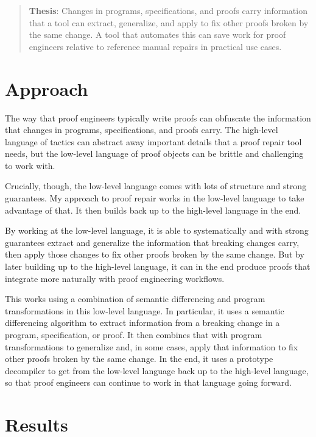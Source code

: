 \begin{quote}
\textbf{Thesis}: Changes in programs, specifications, and proofs carry information that a tool can extract, generalize, and apply to fix other proofs broken by the same change. A tool that automates this can save work for proof engineers relative to reference manual repairs in practical use cases.
\end{quote}

\section{Approach}

The way that proof engineers typically write proofs can obfuscate the information that changes in programs, specifications, and proofs carry.
The high-level language of tactics can abstract away important details that a proof repair tool needs,
but the low-level language of proof objects can be brittle and challenging to work with.

Crucially, though, the low-level language comes with lots of structure and strong guarantees.
My approach to proof repair works in the low-level language to take advantage of that.
It then builds back up to the high-level language in the end.

By working at the low-level language, it is able to systematically and with strong guarantees extract and generalize the 
information that breaking changes carry,
then apply those changes to fix other proofs broken by the same change.
But by later building up to the high-level language,
it can in the end produce proofs that integrate more naturally with proof engineering workflows.

This works using a combination of semantic differencing and program transformations in this low-level language.
In particular, it uses a semantic differencing algorithm to extract information from a breaking change in a program, specification, or proof.
It then combines that with program transformations to generalize and, in some cases, apply that information to fix other 
proofs broken by the same change.
In the end, it uses a prototype decompiler to get from the low-level language back up to the high-level language,
so that proof engineers can continue to work in that language going forward. %

\section{Results}

